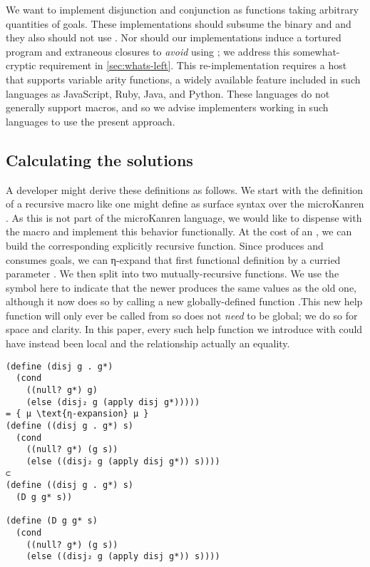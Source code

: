 \documentclass[sigplan,balance=true,pbalance=true,natbib=false]{acmart}
\begin{document}
We want to implement disjunction and conjunction as functions taking
arbitrary quantities of goals. These implementations should subsume
the binary  and  and they also
should not use . Nor should our implementations
induce a tortured program and extraneous closures to \emph{avoid}
using ; we address this somewhat-cryptic requirement
in \cref{sec:whats-left}. This re-implementation requires a host that
supports variable arity functions, a widely available feature included
in such languages as JavaScript, Ruby, Java, and Python. These
languages do not generally support macros, and so we advise
implementers working in such languages to use the present approach.

\subsection{Calculating the solutions}

A developer might derive these definitions as follows. We start with
the definition of a recursive  macro like one might
define as surface syntax over the microKanren . As
this is not part of the microKanren language, we would like to
dispense with the macro and implement this behavior functionally. At
the cost of an , we can build the corresponding
explicitly recursive  function. Since
 produces and consumes goals, we can η-expand that
first functional definition by a curried parameter . We
then split  into two mutually-recursive functions. We
use the symbol  here to indicate that the newer
 produces the same values as the old one, although it
now does so by calling a new globally-defined function
.\@ This new help function will only ever be called from
 so does not \emph{need} to be global; we do so for
space and clarity. In this paper, every such help function we
introduce with  could have instead been local and the
relationship actually an equality.

\begin{verbatim}
(define (disj g . g*)
  (cond
    ((null? g*) g)
    (else (disj₂ g (apply disj g*)))))
= { μ \text{η-expansion} μ }
(define ((disj g . g*) s)
  (cond
    ((null? g*) (g s))
    (else ((disj₂ g (apply disj g*)) s))))
⊂
(define ((disj g . g*) s)
  (D g g* s))

(define (D g g* s)
  (cond
    ((null? g*) (g s))
    (else ((disj₂ g (apply disj g*)) s))))
\end{verbatim}
\end{document}

